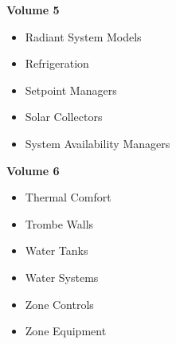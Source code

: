 \textbf{Volume 5}

\begin{itemize}
  \item Radiant System Models
  \item Refrigeration
  \item Setpoint Managers
  \item Solar Collectors
  \item System Availability Managers
\end{itemize}

\textbf{Volume 6}

\begin{itemize}
  \item Thermal Comfort
  \item Trombe Walls
  \item Water Tanks
  \item Water Systems
  \item Zone Controls
  \item Zone Equipment
\end{itemize}
